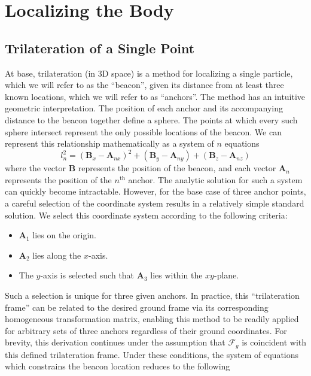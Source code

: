 \documentclass{report}
\begin{document}
\newpage

		\section{Localizing the Body}
			\subsection{Trilateration of a Single Point}
				At base, trilateration (in 3D space) is a method for localizing a single particle, which we will refer to as the ``beacon'', given its distance from at least three known locations, which we will refer to as ``anchors''. The method has an intuitive geometric interpretation. The position of each anchor and its accompanying distance to the beacon together define a sphere. The points at which every such sphere intersect represent the only possible locations of the beacon. We can represent this relationship mathematically as a system of $n$ equations
				\begin{equation}
					l_n^2=(\mathbf{B}_x-\mathbf{A}_{nx})^2+(\mathbf{B}_y-\mathbf{A}_{ny})+(\mathbf{B}_z-\mathbf{A}_{nz})
				\end{equation}
				where the vector $\mathbf{B}$ represents the position of the beacon, and each vector $\mathbf{A}_n$ represents the position of the $n^\text{th}$ anchor. The analytic solution for such a system can quickly become intractable. However, for the base case of three anchor points, a careful selection of the coordinate system results in a relatively simple standard solution. We select this coordinate system according to the following criteria:
				\begin{itemize}
					\item $\mathbf{A}_1$ lies on the origin.
					\item $\mathbf{A}_2$ lies along the $x$-axis.
					\item The $y$-axis is selected such that $\mathbf{A}_3$ lies within the $xy$-plane.
				\end{itemize}
				Such a selection is unique for three given anchors. In practice, this ``trilateration frame'' can be related to the desired ground frame via its corresponding homogeneous transformation matrix, enabling this method to be readily applied for arbitrary sets of three anchors regardless of their ground coordinates. For brevity, this derivation continues under the assumption that $\mathcal{F}_g$ is coincident with this defined trilateration frame. Under these conditions, the system of equations which constrains the beacon location reduces to the following
\end{document}
